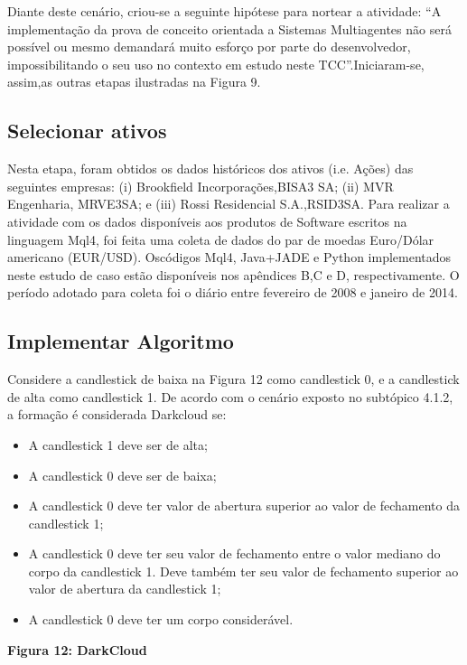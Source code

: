 Diante deste cenário, criou-se a seguinte hipótese para nortear a atividade: “A implementação da prova de conceito orientada a Sistemas Multiagentes não será possível ou mesmo demandará muito esforço por parte do desenvolvedor, impossibilitando o seu uso no contexto em estudo neste TCC”.Iniciaram-se, assim,as outras etapas ilustradas na Figura 9.

\subsection{Selecionar ativos}

Nesta etapa, foram obtidos os dados históricos dos ativos (i.e. Ações) das seguintes empresas: (i) Brookfield Incorporações,BISA3 SA; (ii) MVR Engenharia, MRVE3SA; e (iii) Rossi Residencial S.A.,RSID3SA. Para realizar a atividade com os dados disponíveis aos produtos de Software escritos na linguagem Mql4, foi feita uma coleta de dados do par de moedas Euro/Dólar americano (EUR/USD). Oscódigos Mql4, Java+JADE e Python implementados neste estudo de caso estão disponíveis nos apêndices B,C e D, respectivamente. O período adotado para coleta foi o diário entre fevereiro de 2008 e janeiro de 2014.



\subsection{Implementar Algoritmo}

Considere a candlestick de baixa na Figura 12 como candlestick 0, e a candlestick de alta como candlestick 1. De acordo com o cenário exposto no subtópico 4.1.2, a formação é considerada Darkcloud se:

\begin{itemize}
  \item A candlestick 1 deve ser de alta;
  \item A candlestick 0 deve ser de baixa;
  \item A candlestick 0 deve ter valor de abertura superior ao valor de fechamento da candlestick 1;
  \item A candlestick 0 deve ter seu valor de fechamento entre o valor mediano do corpo da candlestick 1. Deve também ter seu valor de fechamento superior ao valor de abertura da candlestick 1;
  \item A candlestick 0 deve ter um corpo considerável.
\end{itemize}

\textbf{Figura 12: DarkCloud}

